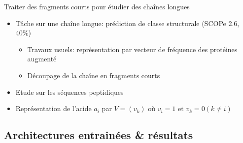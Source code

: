 \documentclass{beamer}
\begin{document}
\begin{frame}{Traiter des fragments courts pour étudier des chaînes longues}

    \begin{itemize}
    \item Tâche sur une chaîne longue: prédiction de classe structurale (SCOPe
      2.6, 40\%)
      \begin{itemize}
      \item Travaux usuels: représentation par vecteur de fréquence des
        protéines augmenté
      \item Découpage de la chaîne en fragments courts
      \end{itemize}
    \item Etude sur les séquences peptidiques
    \item Représentation de l'acide $a_i$ par $V = (v_k)$ où $v_i = 1$ et $v_k =
      0 (k\ne i)$
    \end{itemize}
\end{frame}

\subsection{Architectures entrainées \& résultats}
\end{document}
